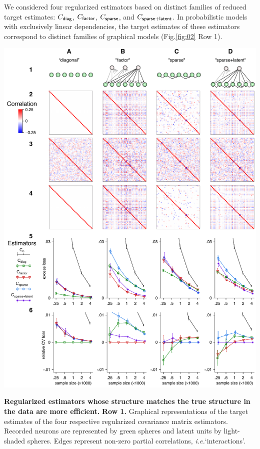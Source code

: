 \documentclass[10pt]{article}
\newcommand{\sq}[1]{\lq#1\rq}
\newcommand{\figref}[2]{Fig.\;\ref{fig:#1}\,#2}
\newcommand{\ie}{\emph{i.e.}\;}
\begin{document}
We considered four regularized estimators based on distinct families of reduced target estimates: $C_{\sf diag}$, $C_{\sf factor}$, $C_{\sf sparse}$, and $C_{\sf sparse+latent}$. In probabilistic models with exclusively linear dependencies, the target estimates of these estimators correspond to distinct families of graphical models (\figref{02}{\,Row 1}).  

\begin{FPfigure}
    \begin{center}
        \includegraphics{./figures/Figure02.pdf}
    \end{center}
    \caption{{\bf Regularized estimators whose structure matches the true structure in the data are more efficient.}
    {\bf Row 1.} Graphical representations of the target estimates of the four respective regularized covariance matrix estimators.  Recorded neurons are represented by green spheres and latent units by light-shaded spheres.  Edges represent non-zero partial correlations, \ie \sq{interactions}.
}
\end{FPfigure}
\end{document}
